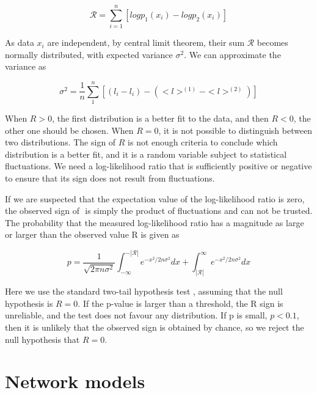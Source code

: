 \begin{equation}
\mathcal{R} = \sum_{i=1}^{n} \left[log p_1(x_i) - log p_2(x_i)\right]
\end{equation}

As data $x_i$ are independent, by central limit theorem, their sum $\mathcal{R}$ becomes normally distributed, with expected variance $\sigma^2$. We can approximate the variance as 

$$\sigma^2 = \frac{1}{n}\sum_{1}^{n}[(l_i - l_i) - (<l>^{(1)}- <l>^{(2)})]$$

When $R>0$, the first distribution is a better fit to the data, and then $R<0$, the other one should be chosen. When $R=0$, it is not possible to distinguish between two distributions. The sign of $R$ is not enough criteria to conclude which distribution is a better fit, and it is a random variable subject to statistical fluctuations. We need a log-likelihood ratio that is sufficiently positive or negative to ensure that its sign does not result from fluctuations.

If we are suspected that the expectation value of the log-likelihood ratio is zero, the observed sign of $\mathcal {} $ is simply the product of fluctuations and can not be trusted. The probability that the measured log-likelihood ratio has a magnitude as large or larger than the observed value R is given as

\begin{equation}
p = \frac{1}{\sqrt{2\pi n \sigma^2}} \int_{-\infty}^{-|\mathcal{R}|}e^{-x^2/2n\sigma^2}dx + \int_{|\mathcal{R}|}^{\infty}e^{-x^2/2n\sigma^2}dx
\end{equation}

Here we use the standard two-tail hypothesis test \cite{clauset2009power}, assuming that the null hypothesis is  $R= 0$. If the p-value is larger than a threshold, the R sign is unreliable, and the test does not favour any distribution. If p is small, $p<0.1$, then it is unlikely that the observed sign is obtained by chance, so we reject the null hypothesis that $R=0$. 

\section{Network models}

